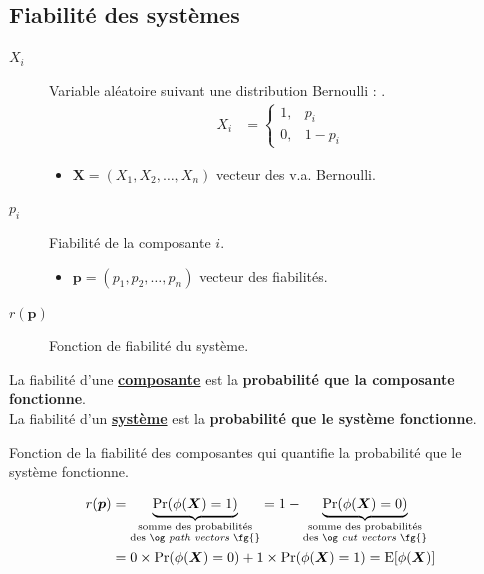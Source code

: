 \documentclass[10pt, french]{article}
\begin{document}
\begin{multicols*}{2}
\subsection{Fiabilité des systèmes}
\begin{distributions}[Notation]
\begin{description}
	\item[$X_{i}$]	Variable aléatoire suivant une distribution Bernoulli : .
		\begin{align*}
		X_{i}
		&=	\begin{cases}
			1,	&	p_{i}	\\
			0,	&	1 - p_{i}
			\end{cases}
		\end{align*}
		\begin{itemize}
		\item	$\bm{X} = (X_{1}, X_{2}, \dots, X_{n})$ vecteur des v.a. Bernoulli.
		\end{itemize}
	\item[$p_{i}$]	Fiabilité de la composante $i$.
		\begin{itemize}
		\item	$\bm{p} = (p_{1}, p_{2}, \dots, p_{n})$ vecteur des fiabilités.
		\end{itemize}
	\item[$r(\bm{p})$]	Fonction de fiabilité du système.
\end{description}
\end{distributions}

\begin{definitionNOHFILL}[Fiabilité]
La fiabilité d'une \textbf{\underline{composante}} est la \textbf{probabilité que la composante fonctionne}.\\

La fiabilité d'un \textbf{\underline{système}} est la \textbf{probabilité que le système fonctionne}.
\end{definitionNOHFILL}

\begin{definitionNOHFILLsub}
Fonction de la fiabilité des composantes  qui quantifie la probabilité que le système fonctionne.

\begin{align*}
	r(\bm{p})
	&=	\underbrace{\Pr(\phi(\bm{X}) = 1)}_{\substack{\text{somme des probabilités}\\ \text{des \og \textit{path vectors} \fg{}}}}
	=	1 - \underbrace{\Pr(\phi(\bm{X}) = 0)}_{\substack{\text{somme des probabilités}\\ \text{des \og \textit{cut vectors} \fg{}}}}	\\
	&=	0 \times \Pr(\phi(\bm{X}) = 0) + 1 \times \Pr(\phi(\bm{X}) = 1) 
	= \text{E}[\phi(\bm{X})]
\end{align*}


\end{definitionNOHFILLsub}
\end{multicols*}
\end{document}
